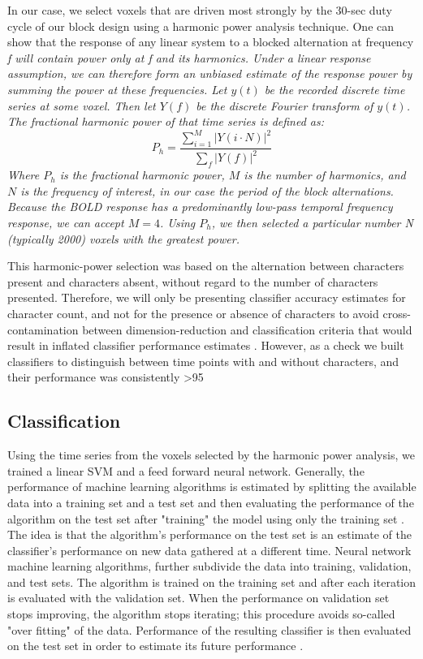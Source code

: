 \documentclass[preprint,5p,authoryear]{elsarticle}
\begin{document}
In our case, we select voxels that are driven most strongly by the 30-sec duty cycle of our block design
using a harmonic power analysis technique. 
One can show that the response of any linear system to a blocked alternation at frequency \it{f} will contain power only at \it{f} and its harmonics. 
Under a linear response assumption, we can therefore form an unbiased estimate of the response power by summing the power at these frequencies. 
Let $y(t)$ be the recorded discrete time series at some voxel.
Then let $Y(f)$ be the discrete Fourier transform of $y(t)$.
The fractional harmonic power of that time series is defined as:
\begin{equation}
P_h = \frac{\sum_{i = 1}^{M}{\left|Y(i \cdot N)\right|^{2}}}{\sum_{f}{\left|Y(f)\right|^{2}}}
\end{equation}
Where $P_h$ is the fractional harmonic power, $M$ is the number of harmonics, and $N$ is the frequency of interest, in our case the period of the block alternations. 
Because the BOLD response has a predominantly low-pass temporal frequency response, we can accept $M = 4$. 
Using $P_h$, we then selected a particular number \it{N} (typically 2000) voxels with the greatest power. 

This harmonic-power selection was based on the alternation between characters present and characters absent, without regard to the number of characters presented. 
Therefore, we will only be presenting classifier accuracy estimates for character count, and not for the presence or absence of characters to avoid cross-contamination between dimension-reduction and  classification criteria that would result in inflated classifier performance estimates \citep{CrossContamination}.
However, as a check we built classifiers to distinguish between time points with and without characters, and their performance was consistently >95%

\subsection{Classification}
Using the time series from the voxels selected by the harmonic power analysis, we trained a linear SVM and a feed forward neural network.
Generally, the performance of machine learning algorithms is estimated by splitting the available data into a training set and a test set and then evaluating the performance of the algorithm on the test set after "training" the model using only the training set \citep{needRef1}.
The idea is that the algorithm's performance on the test set is an estimate of the classifier's performance on new data gathered at a different time.
Neural network machine learning algorithms, further subdivide the data into training, validation, and test sets.
The algorithm is trained on the training set and after each iteration is evaluated with the validation set.
When the performance on validation set stops improving, the algorithm stops iterating; this procedure avoids so-called "over fitting" of the data.
Performance of the resulting classifier is then evaluated on the test set in order to estimate its future performance \citep{needRef2}.
\end{document}
